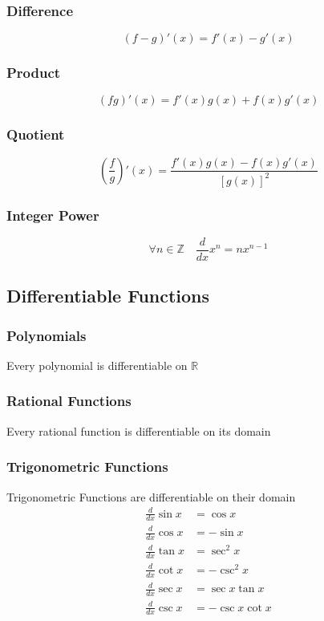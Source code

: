 \documentclass[../ma2002_notes.tex]{subfiles}
\begin{document}
\subsubsection{Difference}
\[(f-g)'(x)=f'(x)-g'(x)\]

\subsubsection{Product}
\[(fg)'(x)=f'(x)g(x)+f(x)g'(x)\]

\subsubsection{Quotient}
\[\left(\frac{f}{g}\right)'(x)=\frac{f'(x)g(x)-f(x)g'(x)}{[g(x)]^2}\]

\subsubsection{Integer Power}
\[\forall n\in\mathbb{Z}\quad\frac{d}{dx}x^n=nx^{n-1}\]

\subsection{Differentiable Functions}
\subsubsection{Polynomials}
Every polynomial is differentiable on \(\mathbb{R}\)

\subsubsection{Rational Functions}
Every rational function is differentiable on its domain

\subsubsection{Trigonometric Functions}
Trigonometric Functions are differentiable on their domain
\begin{align*}
	\frac{d}{dx}\sin x&=\cos x\\
	\frac{d}{dx}\cos x&=-\sin x\\
	\frac{d}{dx}\tan x&=\sec^2x\\
	\frac{d}{dx}\cot x&=-\csc^2x\\
	\frac{d}{dx}\sec x&=\sec x\tan x\\
	\frac{d}{dx}\csc x&=-\csc x\cot x
\end{align*}
\end{document}
